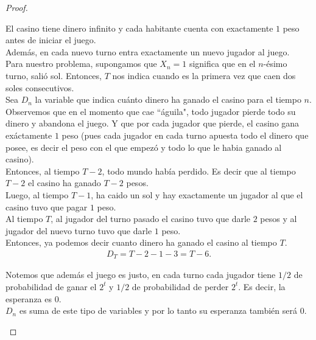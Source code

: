 \begin{proof}
\begin{enumerate}
		   	\;El casino tiene dinero infinito y cada habitante cuenta con exactamente $1$ peso antes de
		   	iniciar el juego.\\
		   
		   	Además, en cada nuevo turno entra exactamente un nuevo jugador al juego.\\
		   
		   	Para nuestro problema, supongamos que $X_n = 1$ significa que en el $n$-ésimo turno, salió sol.
		   	Entonces, $T$ nos indica cuando es la primera vez que caen dos soles consecutivos.\\
		   
		   	Sea $D_n$ la variable que indica cuánto dinero ha ganado el casino para el tiempo $n$.\\
		   
		   	Observemos que en el momento que cae ``águila", todo jugador pierde todo su dinero y abandona el juego.
		   	Y que por cada jugador que pierde, el casino gana exáctamente $1$ peso (pues cada jugador en cada
		   	turno apuesta todo el dinero que posee, es decir el peso con el que empezó y todo lo que le habia
		   	ganado al casino).\\
		   
		   	Entonces, al tiempo $T-2$, todo mundo había perdido. Es decir que al tiempo $T-2$ el casino ha ganado
		   	$T-2$ pesos.\\
		   
		   	Luego, al tiempo $T-1$, ha caido un sol y hay exactamente un jugador al que el casino tuvo 
		   	que pagar $1$ peso.\\
		   
		   	Al tiempo $T$, al jugador del turno pasado el casino tuvo que darle $2$ pesos y al jugador del nuevo
		   	turno tuvo que darle $1$ peso.\\
		   
		   	Entonces, ya podemos decir cuanto dinero ha ganado el casino al tiempo $T$.
			\begin{align}\label{problema1_3:Dinero_al_tiempo_T}
				D_T = T-2 - 1 - 3 = T - 6. 
			\end{align}					   
		   
		   	Notemos que además el juego es justo, en cada turno cada jugador tiene $1/2$ de probabilidad de
		   	ganar el $2^t$ y $1/2$ de probabilidad de perder $2^t$. Es decir, la esperanza es $0$.\\
		   	
		   	$D_n$ es suma de este tipo de variables y por lo tanto su esperanza también será $0$.\\
		   

\end{enumerate}
\end{proof}
